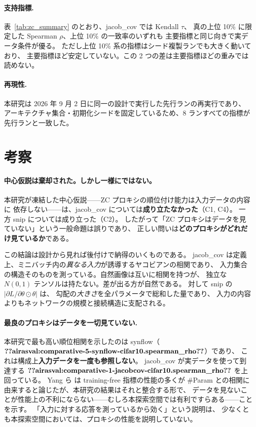 \documentclass[11pt]{article}
\providecommand{\airasval}[1]{\textbf{??airasval:\detokenize{#1}??}}
\begin{document}
\paragraph{支持指標.}
表~\ref{tab:zc_summary} のとおり、jacob\_cov では Kendall $\tau$、
真の上位 10\% に限定した Spearman $\rho$、上位 10\% の一致率のいずれも
主要指標と同じ向きで実データ条件が優る。
ただし上位 10\% 系の指標はシード複製ランでも大きく動いており、
主要指標ほど安定していない。この 2 つの差は主要指標ほどの重みでは読めない。

\paragraph{再現性.}
本研究は 2026 年 9 月 2 日に同一の設計で実行した先行ランの再実行であり、
アーキテクチャ集合・初期化シードを固定しているため、8 ランすべての指標が
先行ランと一致した。

\section{考察}
\label{sec:discussion}

\paragraph{中心仮説は棄却された。しかし一様にではない。}
本研究が凍結した中心仮説——ZC プロキシの順位付け能力は入力データの内容に
依存しない——は、jacob\_cov については\textbf{成り立たなかった}（C1, C4）。
一方 snip については成り立った（C2）。
したがって「ZC プロキシはデータを見ていない」という一般命題は誤りであり、
正しい問いは\textbf{どのプロキシがどれだけ見ているか}である。

この結論は設計から見れば後付けで納得のいくものである。
jacob\_cov は定義上、ミニバッチ内の\emph{異なる入力}が誘導するヤコビアンの相関であり、
入力集合の構造そのものを測っている。自然画像は互いに相関を持つが、
独立な $N(0,1)$ テンソルは持たない。差が出る方が自然である。
対して snip の $|\partial L/\partial\theta \odot \theta|$ は、
勾配の\emph{大きさ}を全パラメータで総和した量であり、
入力の内容よりもネットワークの規模と接続構造に支配される。

\paragraph{最良のプロキシはデータを一切見ていない.}
本研究で最も高い順位相関を示したのは synflow（$\airasval{comparative-5-synflow-cifar10.spearman_rho}$）であり、
これは構成上\textbf{入力データを一度も参照しない}。
jacob\_cov が実データを使って到達する $\airasval{comparative-1-jacobcov-cifar10.spearman_rho}$ を上回っている。
Yang ら \cite{yang2023revisiting} は training-free 指標の性能の多くが
\#Param との相関に由来すると論じたが、本研究の結果はそれと整合する形で、
データを見ないことが性能上の不利にならない——むしろ本探索空間では有利ですらある——ことを示す。
「入力に対する応答を測っているから効く」という説明は、
少なくとも本探索空間においては、プロキシの性能を説明していない。
\end{document}
